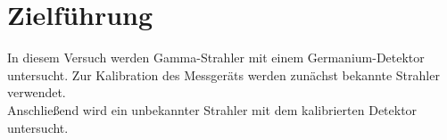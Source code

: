 \section{Zielführung}
In diesem Versuch werden Gamma-Strahler mit einem Germanium-Detektor untersucht. Zur Kalibration des Messgeräts werden zunächst bekannte Strahler verwendet. \\
Anschließend wird ein unbekannter Strahler mit dem kalibrierten Detektor untersucht. 
